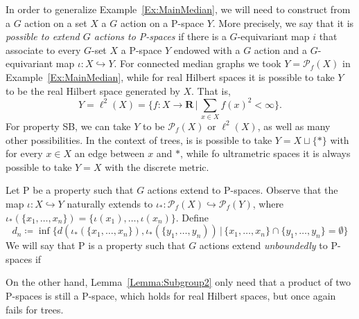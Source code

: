 In order to generalize Example~\ref{Ex:MainMedian}, we will need to construct from a $G$ action on a set $X$ a $G$ action on a P-space $Y$.
More precisely, we say that it is \emph{possible to extend $G$ actions to P-spaces} if there is a $G$-equivariant map $i$ that associate to every $G$-set $X$ a P-space $Y$ endowed with a $G$ action and a $G$-equivariant map $\iota\colon X\hookrightarrow Y$.
For connected median graphs we took $Y=\mathcal P_f(X)$ in Example~\ref{Ex:MainMedian}, while for real Hilbert spaces it is possible to take $Y$ to be the real Hilbert space generated by $X$. That is, 
\[Y=\ell^2(X)=\bigg\{f\colon X\to \mathbf R\,\bigg|\, \sum_{x\in X}f(x)^2<\infty\bigg\}.\]
For property SB, we can take $Y$ to be  $\mathcal P_f(X)$ or $\ell^2(X)$, as well as many other possibilities.
In the context of trees, is is possible to take $Y=X\sqcup\{*\}$ with for every $x\in X$ an edge between $x$ and $*$, while fo ultrametric spaces it is always possible to take $Y=X$ with the discrete metric.

Let P be a property such that $G$ actions extend to P-spaces.
Observe that the map $\iota\colon X\hookrightarrow Y$ naturally extends to $\iota_*\colon \mathcal P_f(X)\hookrightarrow \mathcal P_f(Y)$, where $\iota_*(\{x_1,\dots,x_n\})=\{\iota(x_1),\dots,\iota(x_n)\}$.
Define
\[d_n\coloneqq\inf\{d(\iota_*(\{x_1,\dots,x_n\}),\iota_*(\{y_1,\dots,y_n))\,|\,\{x_1,\dots,x_n\}\cap\{y_1,\dots,y_n\}=\emptyset \}\]
We will say that P is a property such that $G$ actions extend \emph{unboundedly} to P-spaces if

On the other hand, Lemma~\ref{Lemma:Subgroup2} only need that a product of two P-spaces is still a P-space, which holds for real Hilbert spaces, but once again fails for trees.


